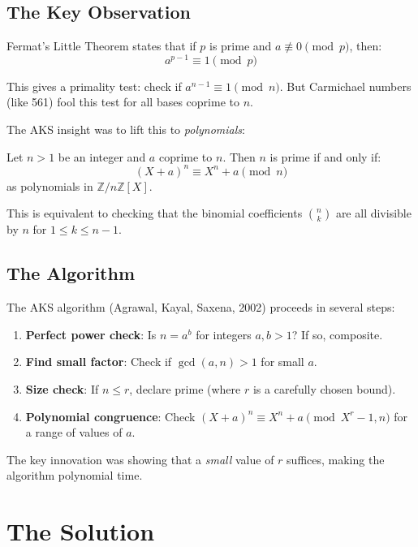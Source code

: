 \subsection{The Key Observation}

Fermat's Little Theorem states that if $p$ is prime and $a \not\equiv 0 \pmod{p}$, then:
\begin{equation}
a^{p-1} \equiv 1 \pmod{p}
\end{equation}

This gives a primality test: check if $a^{n-1} \equiv 1 \pmod{n}$. But Carmichael numbers (like 561) fool this test for all bases coprime to $n$.

The AKS insight was to lift this to \emph{polynomials}:

\begin{theorem}
Let $n > 1$ be an integer and $a$ coprime to $n$. Then $n$ is prime if and only if:
\begin{equation}
(X + a)^n \equiv X^n + a \pmod{n}
\end{equation}
as polynomials in $\mathbb{Z}/n\mathbb{Z}[X]$.
\end{theorem}

This is equivalent to checking that the binomial coefficients $\binom{n}{k}$ are all divisible by $n$ for $1 \leq k \leq n-1$.

\subsection{The Algorithm}

The AKS algorithm (Agrawal, Kayal, Saxena, 2002) proceeds in several steps:

\begin{enumerate}
\item \textbf{Perfect power check}: Is $n = a^b$ for integers $a, b > 1$? If so, composite.
\item \textbf{Find small factor}: Check if $\gcd(a, n) > 1$ for small $a$.
\item \textbf{Size check}: If $n \leq r$, declare prime (where $r$ is a carefully chosen bound).
\item \textbf{Polynomial congruence}: Check $(X + a)^n \equiv X^n + a \pmod{X^r - 1, n}$ for a range of values of $a$.
\end{enumerate}

The key innovation was showing that a \emph{small} value of $r$ suffices, making the algorithm polynomial time.

\section{The Solution}

